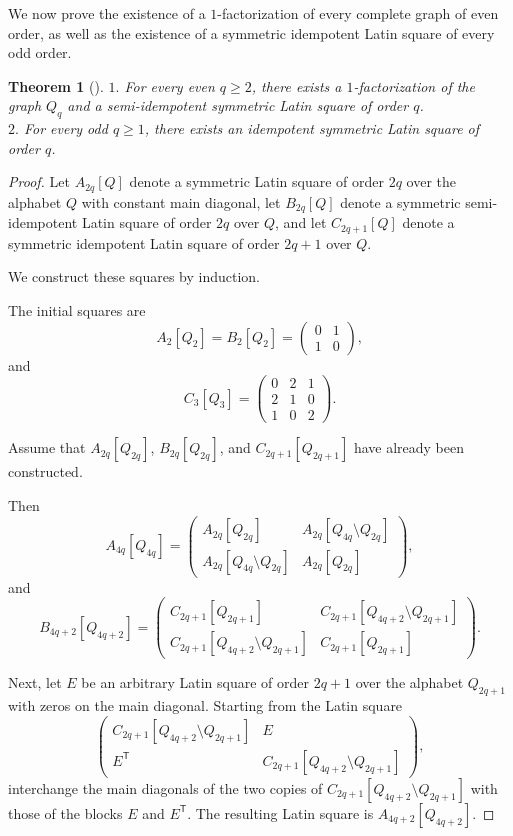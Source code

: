 \documentclass[11pt]{article}
\newtheorem{theorem}{Theorem}[section]
\theoremstyle{definition}
\begin{document}
{{{We now prove the existence of a $1$-factorization of every complete
graph of even order, as well as the existence of a symmetric
idempotent Latin square of every odd order.

\begin{theorem}[\cite{Rosa}]\label{th:LSsym}
$1.$ For every even $q\ge2$, there exists a $1$-factorization of the graph
$Q_q$ and a semi-idempotent symmetric Latin square of order $q$. \\
$2.$
For every odd $q\ge1$, there exists an idempotent symmetric Latin
square of order $q$.
\end{theorem}

\begin{proof}
Let $A_{2q}[Q]$ denote a symmetric Latin square of order $2q$ over the
alphabet $Q$ with constant main diagonal,
let $B_{2q}[Q]$ denote a symmetric semi-idempotent Latin square of order $2q$ over
$Q$, and let
$C_{2q+1}[Q]$ denote a symmetric idempotent Latin square of order $2q+1$ over $Q$.

We construct these squares by induction.

The initial squares are
\[
A_2[Q_2]=B_2[Q_2]=
\left(
\begin{array}{cc}
0&1\\
1&0
\end{array}
\right),
\]
and
\[
C_3[Q_3]=
\left(
\begin{array}{ccc}
0&2&1\\
2&1&0\\
1&0&2
\end{array}
\right).
\]

Assume that
$A_{2q}[Q_{2q}]$,
$B_{2q}[Q_{2q}]$,
and
$C_{2q+1}[Q_{2q+1}]$
have already been constructed.

Then
\[
A_{4q}[Q_{4q}]
=
\left(
\begin{array}{cc}
A_{2q}[Q_{2q}]&
A_{2q}[Q_{4q}\setminus Q_{2q}]\\
A_{2q}[Q_{4q}\setminus Q_{2q}]&
A_{2q}[Q_{2q}]
\end{array}
\right),
\]
and
\[
B_{4q+2}[Q_{4q+2}]
=
\left(
\begin{array}{cc}
C_{2q+1}[Q_{2q+1}]&
C_{2q+1}[Q_{4q+2}\setminus Q_{2q+1}]\\
C_{2q+1}[Q_{4q+2}\setminus Q_{2q+1}]&
C_{2q+1}[Q_{2q+1}]
\end{array}
\right).
\]

Next, let $E$ be an arbitrary Latin square of order $2q+1$ over the
alphabet $Q_{2q+1}$ with zeros on the main diagonal.
Starting from the Latin square
\[
\left(
\begin{array}{cc}
C_{2q+1}[Q_{4q+2}\setminus Q_{2q+1}]&E\\
E^{\mathsf T}&
C_{2q+1}[Q_{4q+2}\setminus Q_{2q+1}]
\end{array}
\right),
\]
interchange the main diagonals of the two copies of
$C_{2q+1}[Q_{4q+2}\setminus Q_{2q+1}]$
with those of the blocks
$E$
and
$E^{\mathsf T}$.
The resulting Latin square is
$A_{4q+2}[Q_{4q+2}]$.


\end{proof}}}}
\end{document}
